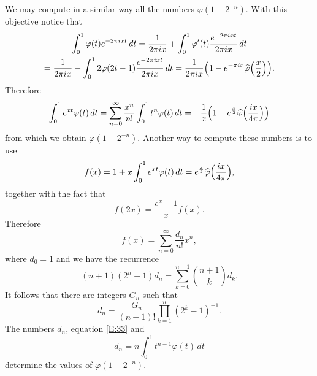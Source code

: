 \documentclass[10pt]{amsart}
\theoremstyle{definition}
\theoremstyle{remark}
\begin{document}
We may compute in a similar way all the numbers $\varphi(1-2^{-n})$. With this objective
notice that
\begin{multline*}
\int_0^1\varphi(t)e^{-2\pi i xt}\,dt=\frac{1}{2\pi i x}+\int_0^1\varphi'(t)
\frac{e^{-2\pi i x t}}{2\pi i x}\,dt\\
=\frac{1}{2\pi i x}-\int_0^1 2\varphi(2t-1)
\frac{e^{-2\pi i x t}}{2\pi i x}\,dt
=\frac{1}{2\pi i x}\Bigl(1-e^{-\pi i x}\widehat\varphi\Bigl(\frac{x}{2}\Bigr)\Bigr).
\end{multline*}
Therefore
\begin{equation}\label{E:36}
\int_0^1e^{xt}\varphi(t)\,dt=\sum_{n=0}^\infty \frac{x^n}{n!}\int_0^1t^n\varphi(t)\,dt
=-\frac{1}{x}\Bigl(1-e^{\frac{x}{2}}
\widehat\varphi\Bigl(\frac{ix}{4\pi}\Bigr)\Bigr)
\end{equation}
from which we obtain $\varphi(1-2^{-n})$. Another way to compute these numbers is
to use 
\begin{equation}\label{E:37}
f(x)=1+x\int_0^1 e^{xt}\varphi(t)\,dt=e^{\frac{x}{2}}
\widehat\varphi\Bigl(\frac{ix}{4\pi}\Bigr),
\end{equation}
together with the fact that
\begin{equation}\label{E:38}
f(2x)=\frac{e^x-1}{x}f(x).
\end{equation}
Therefore 
\begin{equation}\label{E:39}
f(x)=\sum_{n=0}^\infty \frac{d_n}{n!}x^n,
\end{equation}
where $d_0=1$ and we have the recurrence
\begin{equation}\label{E:40}
(n+1)(2^n-1)d_n=\sum_{k=0}^{n-1}\binom{n+1}{k}d_k.
\end{equation}
It follows that there are integers $G_n$ such that
\begin{equation}\label{E:41}
d_n=\frac{G_n}{(n+1)!}\prod_{k=1}^n(2^k-1)^{-1}.
\end{equation}
The numbers $d_n$, equation \eqref{E:33} and
\begin{equation}\label{E:42}
d_n=n\int_0^1t^{n-1}\varphi(t)\,dt
\end{equation}
determine the values of $\varphi(1-2^{-n})$.
\end{document}
